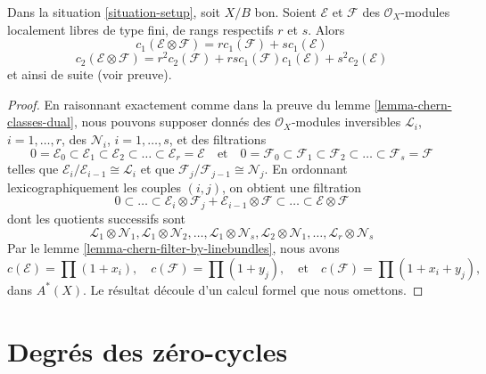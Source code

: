 \begin{lemma}
\label{lemma-chern-classes-tensor-product}
Dans la situation \ref{situation-setup}, soit $X/B$ bon. Soient
$\mathcal{E}$ et $\mathcal{F}$ des $\mathcal{O}_X$-modules localement libres de
type fini, de rangs respectifs $r$ et $s$. Alors
$$
c_1(\mathcal{E} \otimes \mathcal{F})
=
r c_1(\mathcal{F}) + s c_1(\mathcal{E})
$$
$$
c_2(\mathcal{E} \otimes \mathcal{F})
=
r^2 c_2(\mathcal{F}) +
rs c_1(\mathcal{F})c_1(\mathcal{E}) +
s^2 c_2(\mathcal{E})
$$
et ainsi de suite (voir preuve).
\end{lemma}

\begin{proof}
En raisonnant exactement comme dans la preuve du lemme
\ref{lemma-chern-classes-dual}, nous pouvons supposer donnés des
$\mathcal{O}_X$-modules inversibles ${\mathcal L}_i$, $i = 1, \ldots, r$, des
${\mathcal N}_i$, $i = 1, \ldots, s$, et des filtrations
$$
0 = \mathcal{E}_0 \subset \mathcal{E}_1 \subset \mathcal{E}_2
\subset \ldots \subset \mathcal{E}_r = \mathcal{E}
\quad\text{et}\quad
0 = \mathcal{F}_0 \subset \mathcal{F}_1 \subset \mathcal{F}_2
\subset \ldots \subset \mathcal{F}_s = \mathcal{F}
$$
telles que $\mathcal{E}_i/\mathcal{E}_{i - 1} \cong \mathcal{L}_i$ et que
$\mathcal{F}_j/\mathcal{F}_{j - 1} \cong \mathcal{N}_j$. En ordonnant
lexicographiquement les couples $(i, j)$, on obtient une filtration
$$
0 \subset \ldots \subset
\mathcal{E}_i \otimes \mathcal{F}_j
+
\mathcal{E}_{i - 1} \otimes \mathcal{F}
\subset \ldots \subset \mathcal{E} \otimes \mathcal{F}
$$
dont les quotients successifs sont
$$
\mathcal{L}_1 \otimes \mathcal{N}_1,
\mathcal{L}_1 \otimes \mathcal{N}_2,
\ldots,
\mathcal{L}_1 \otimes \mathcal{N}_s,
\mathcal{L}_2 \otimes \mathcal{N}_1,
\ldots,
\mathcal{L}_r \otimes \mathcal{N}_s
$$
Par le lemme \ref{lemma-chern-filter-by-linebundles}, nous avons
$$
c(\mathcal{E}) = \prod (1 + x_i),
\quad
c(\mathcal{F}) = \prod (1 + y_j),
\quad\text{et}\quad
c(\mathcal{F}) = \prod (1 + x_i + y_j),
$$
dans $A^*(X)$. Le résultat découle d'un calcul formel que nous omettons.
\end{proof}











\section{Degrés des zéro-cycles}
\label{section-degree-zero-cycles}

